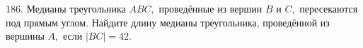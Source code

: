 186. Медианы треугольника $ABC,$ проведённые из вершин $B$ и $C,$ пересекаются под прямым углом. Найдите длину медианы треугольника, проведённой из вершины $A,$ если $|BC| = 42.$\\
